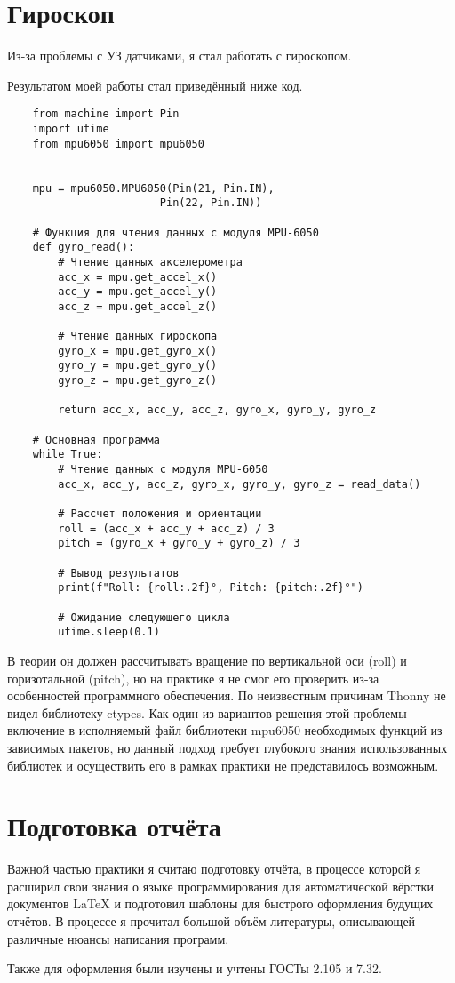 \chapter{Гироскоп}
Из-за проблемы с УЗ датчиками, я стал работать с гироскопом.

Результатом моей работы стал приведённый ниже код.

{\ttfamily
\begin{verbatim}
    from machine import Pin
    import utime
    from mpu6050 import mpu6050


    mpu = mpu6050.MPU6050(Pin(21, Pin.IN),
                        Pin(22, Pin.IN))

    # Функция для чтения данных с модуля MPU-6050
    def gyro_read():
        # Чтение данных акселерометра
        acc_x = mpu.get_accel_x()
        acc_y = mpu.get_accel_y()
        acc_z = mpu.get_accel_z()

        # Чтение данных гироскопа
        gyro_x = mpu.get_gyro_x()
        gyro_y = mpu.get_gyro_y()
        gyro_z = mpu.get_gyro_z()

        return acc_x, acc_y, acc_z, gyro_x, gyro_y, gyro_z

    # Основная программа
    while True:
        # Чтение данных с модуля MPU-6050
        acc_x, acc_y, acc_z, gyro_x, gyro_y, gyro_z = read_data()

        # Рассчет положения и ориентации
        roll = (acc_x + acc_y + acc_z) / 3
        pitch = (gyro_x + gyro_y + gyro_z) / 3

        # Вывод результатов
        print(f"Roll: {roll:.2f}°, Pitch: {pitch:.2f}°")

        # Ожидание следующего цикла
        utime.sleep(0.1)
\end{verbatim}
}

В теории он должен рассчитывать вращение по вертикальной оси (roll) и горизотальной (pitch), но на практике я не смог его проверить из-за особенностей программного обеспечения. По неизвестным причинам Thonny не видел библиотеку ctypes. Как один из вариантов решения этой проблемы --- включение в исполняемый файл библиотеки mpu6050 необходимых функций из зависимых пакетов, но данный подход требует глубокого знания использованных библиотек и осуществить его в рамках практики не представилось возможным.

\chapter{Подготовка отчёта}
Важной частью практики я считаю подготовку отчёта, в процессе которой я расширил свои знания о языке программирования для автоматической вёрстки документов \LaTeX{} и подготовил шаблоны для быстрого оформления будущих отчётов. В процессе я прочитал большой объём литературы, описывающей различные нюансы написания программ.

Также для оформления были изучены и учтены ГОСТы 2.105 и 7.32.
